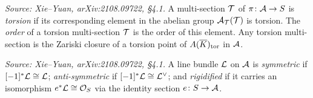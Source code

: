 \begin{definition}
  \label{def:TorsionMultiSection}
  \textit{Source: Xie--Yuan, arXiv:2108.09722, \S4.1.}
  A multi-section \(\mathcal{T}\) of \(\pi\colon \mathcal{A} \to S\) is \emph{torsion} if its corresponding
  element in the abelian group \(\mathcal{A}_{\mathcal{T}}(\mathcal{T})\) is torsion.
  The \emph{order} of a torsion multi-section \(\mathcal{T}\) is the order of this element.
  Any torsion multi-section is the Zariski closure of a torsion point of \(A(\overline{K})_{\rm tor}\)
  in \(\mathcal{A}\).
\end{definition}

\begin{definition}
  \label{def:RigidifiedLineBundle}
  \uses{}
  \textit{Source: Xie--Yuan, arXiv:2108.09722, \S4.1.}
  A line bundle \(\mathcal{L}\) on \(\mathcal{A}\) is \emph{symmetric} if \([-1]^*\mathcal{L} \cong \mathcal{L}\);
  \emph{anti-symmetric} if \([-1]^*\mathcal{L} \cong \mathcal{L}^\vee\); and
  \emph{rigidified} if it carries an isomorphism \(e^*\mathcal{L} \cong \mathcal{O}_S\) via the
  identity section \(e\colon S \to \mathcal{A}\).
\end{definition}

